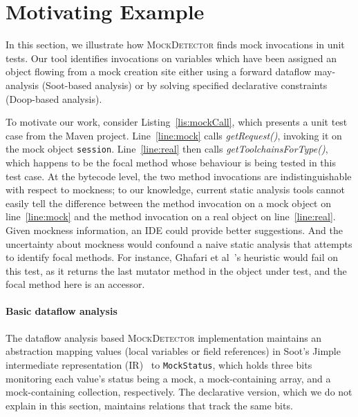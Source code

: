 \section{Motivating Example}
\label{sec:motivating-example}

In this section, we illustrate how \textsc{MockDetector} finds mock invocations in unit tests. Our tool identifies invocations on variables which have been assigned an object flowing from a mock creation site either using a forward dataflow may-analysis (Soot-based analysis) or by solving specified declarative constraints (Doop-based analysis).


To motivate our work, consider Listing~\ref{lis:mockCall}, which presents a unit test case from the Maven project. Line~\ref{line:mock} calls \textit{getRequest()}, invoking it on the mock object \texttt{session}. Line~\ref{line:real} then calls \textit{getToolchainsForType()}, which happens to be the focal method whose behaviour is being tested in this test case. At the bytecode level, the two method invocations are indistinguishable with respect to mockness; to our knowledge, current static analysis tools cannot easily tell the difference between the method invocation on a mock object on line~\ref{line:mock} and the method invocation on a real object on line~\ref{line:real}. Given mockness information, an IDE could provide better suggestions. And the uncertainty about mockness would confound a naive static analysis that attempts to identify focal methods. For instance, Ghafari et al~\cite{ghafari15:_autom}'s heuristic would fail on this test, as it returns the last mutator method in the object under test, and the focal method here is an accessor. 

\paragraph{Basic dataflow analysis} The dataflow analysis based \textsc{MockDetector} implementation maintains an abstraction mapping values (local variables or field references) in Soot's Jimple intermediate representation (IR)~\cite{Vallee-Rai:1999:SJB:781995.782008} to \texttt{MockStatus}, which holds three bits monitoring each value's status being a mock, a mock-containing array, and a mock-containing collection, respectively. The declarative version, which we do not explain in this section, maintains relations that track the same bits.


